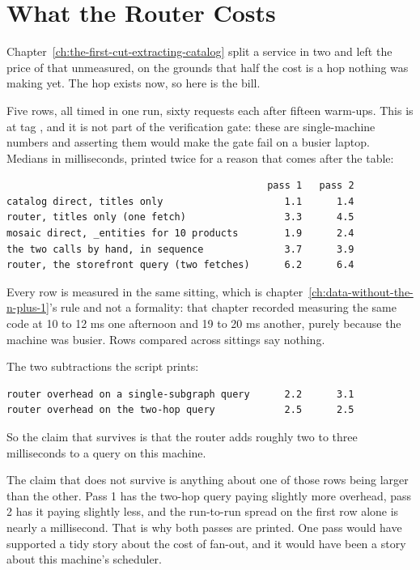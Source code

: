 \section{What the Router Costs}
\label{sec:ch10-what-the-router-costs}
%

Chapter~\ref{ch:the-first-cut-extracting-catalog} split a service in two and
left the price of that unmeasured, on the grounds that half the cost is a hop
nothing was making yet. The hop exists now, so here is the bill.

Five rows, all timed in one run, sixty requests each after fifteen warm-ups.
This is  at tag , and it is not part
of the verification gate: these are single-machine numbers and asserting them
would make the gate fail on a busier laptop. Medians in milliseconds, printed
twice for a reason that comes after the table:

\begin{verbatim}
                                             pass 1   pass 2
catalog direct, titles only                     1.1      1.4
router, titles only (one fetch)                 3.3      4.5
mosaic direct, _entities for 10 products        1.9      2.4
the two calls by hand, in sequence              3.7      3.9
router, the storefront query (two fetches)      6.2      6.4
\end{verbatim}

%
Every row is measured in the same sitting, which is
chapter~\ref{ch:data-without-the-n-plus-1}'s rule and not a formality: that
chapter recorded measuring the same code at 10 to 12 ms one afternoon and 19 to
20 ms another, purely because the machine was busier. Rows compared across
sittings say nothing.

The two subtractions the script prints:

\begin{verbatim}
router overhead on a single-subgraph query      2.2      3.1
router overhead on the two-hop query            2.5      2.5
\end{verbatim}

%
So the claim that survives is that the router adds roughly two to three
milliseconds to a query on this machine.

The claim that does not survive is anything about one of those rows being
larger than the other. Pass 1 has the two-hop query paying slightly more
overhead, pass 2 has it paying slightly less, and the run-to-run spread on the
first row alone is nearly a millisecond. That is why both passes are printed.
One pass would have supported a tidy story about the cost of fan-out, and it
would have been a story about this machine's scheduler.

